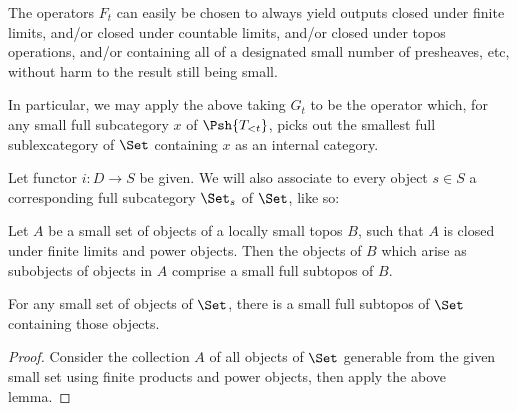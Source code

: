The operators $F_t$ can easily be chosen to always yield outputs closed under finite limits, and/or closed under countable limits, and/or closed under topos operations, and/or containing all of a designated small number of presheaves, etc, without harm to the result still being small.

In particular, we may apply the above taking $G_t$ to be the operator which, for any small full subcategory $x$ of $\Psh{T_{< t}}$, picks out the smallest full sublexcategory of $\Set$ containing $x$ as an internal category. 


\begin{construction}
Let functor $i : D \to S$ be given. We will also associate to every object $s \in S$ a corresponding full subcategory $\Set_s$ of $\Set$, like so: \TODO
\end{construction}

\begin{lemma}
Let $A$ be a small set of objects of a locally small topos $B$, such that $A$ is closed under finite limits and power objects. Then the objects of $B$ which arise as subobjects of objects in $A$ comprise a small full subtopos of $B$.
\end{lemma}

\begin{lemma}
For any small set of objects of $\Set$, there is a small full subtopos of $\Set$ containing those objects.
\end{lemma}
\begin{proof}
Consider the collection $A$ of all objects of $\Set$ generable from the given small set using finite products and power objects, then apply the above lemma.
\end{proof}


